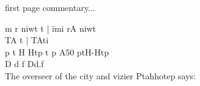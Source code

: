 first page commentary...

\pagebreak

m r niwt t |		\=		imi rA niwt\\
TA t |				\>		TAti	\\	
p t H Htp t p A50	\>		ptH-Htp	\\
D d f				\>		Dd.f		\\

The overseer of the city and vizier Ptahhotep says: